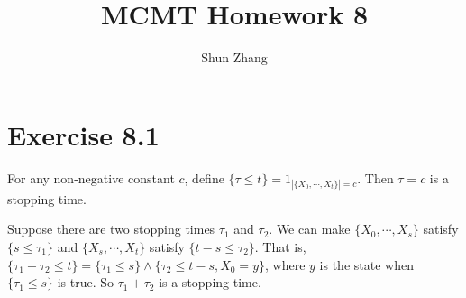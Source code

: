 \documentclass[10pt]{article}
\title{MCMT Homework 8}
\author{Shun Zhang}
\date{}
\begin{document}
\maketitle

\section*{Exercise 8.1}

For any non-negative constant $c$, define $\{\tau \leq t\} = 1_{|\{X_0, \cdots,
X_t\}| = c}$.  Then $\tau = c$ is a stopping time.

Suppose there are two stopping times $\tau_1$ and $\tau_2$.
We can make $\{X_0, \cdots, X_s\}$ satisfy $\{s \leq \tau_1\}$ and $\{X_{s},
\cdots, X_t\}$ satisfy $\{t - s \leq \tau_2\}$.
That is, $\{\tau_1 + \tau_2 \leq t\} = \{\tau_1 \leq s\} \land \{\tau_2 \leq t -
s, X_0 = y\}$, where $y$ is the state when $\{\tau_1 \leq s\}$ is true.
So $\tau_1 + \tau_2$ is a stopping time.
\end{document}
